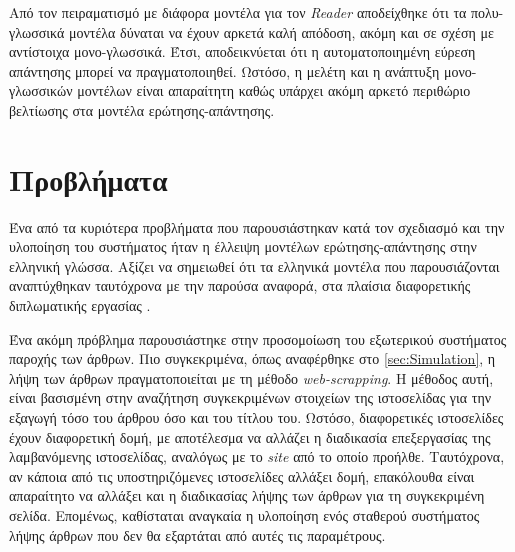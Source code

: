 Από τον πειραματισμό με διάφορα μοντέλα για τον \emph{Reader} αποδείχθηκε ότι τα πολυ-γλωσσικά μοντέλα δύναται να έχουν αρκετά καλή απόδοση, ακόμη και σε σχέση με αντίστοιχα μονο-γλωσσικά. Έτσι, αποδεικνύεται ότι η αυτοματοποιημένη εύρεση απάντησης μπορεί να πραγματοποιηθεί. Ωστόσο, η μελέτη και η ανάπτυξη μονο-γλωσσικών μοντέλων είναι απαραίτητη καθώς υπάρχει ακόμη αρκετό περιθώριο βελτίωσης στα μοντέλα ερώτησης-απάντησης.

\section{Προβλήματα}
Ένα από τα κυριότερα προβλήματα που παρουσιάστηκαν κατά τον σχεδιασμό και την υλοποίηση του συστήματος ήταν η έλλειψη μοντέλων ερώτησης-απάντησης στην ελληνική γλώσσα. Αξίζει να σημειωθεί ότι τα ελληνικά μοντέλα που παρουσιάζονται αναπτύχθηκαν ταυτόχρονα με την παρούσα αναφορά, στα πλαίσια διαφορετικής διπλωματικής εργασίας \cite{Nastos2022}.

Ένα ακόμη πρόβλημα παρουσιάστηκε στην προσομοίωση του εξωτερικού συστήματος παροχής των άρθρων. Πιο συγκεκριμένα, όπως αναφέρθηκε στο \autoref{sec:Simulation}, η λήψη των άρθρων πραγματοποιείται με τη μέθοδο \emph{web-scrapping}. Η μέθοδος αυτή, είναι βασισμένη στην αναζήτηση συγκεκριμένων στοιχείων της ιστοσελίδας για την εξαγωγή τόσο του άρθρου όσο και του τίτλου του. Ωστόσο, διαφορετικές ιστοσελίδες έχουν διαφορετική δομή, με αποτέλεσμα να αλλάζει η διαδικασία επεξεργασίας της λαμβανόμενης ιστοσελίδας, αναλόγως με το \emph{site} από το οποίο προήλθε. Ταυτόχρονα, αν κάποια από τις υποστηριζόμενες ιστοσελίδες αλλάξει δομή, επακόλουθα είναι απαραίτητο να αλλάξει και η διαδικασίας λήψης των άρθρων για τη συγκεκριμένη σελίδα. Επομένως, καθίσταται αναγκαία η υλοποίηση ενός σταθερού συστήματος λήψης άρθρων που δεν θα εξαρτάται από αυτές τις παραμέτρους.
